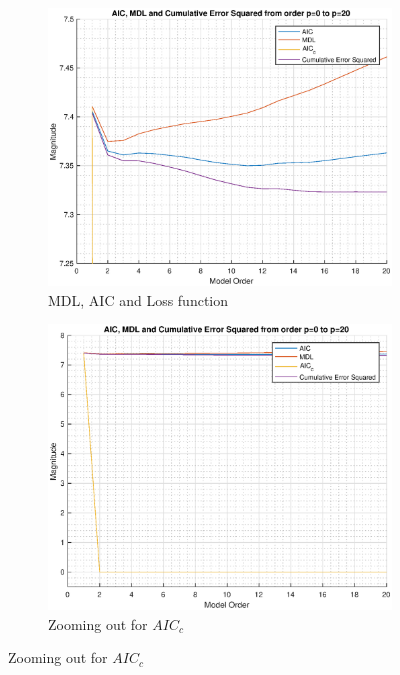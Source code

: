 \begin{figure}[h!]
\centering
\begin{subfigure}{0.32\textwidth}
\centering
\includegraphics[width = \textwidth]{heart_mdl_t1_zoom}
\caption{MDL, AIC and Loss function}
\label{fig:heart_mdl_t1_zoom}
\end{subfigure}
\begin{subfigure}{0.32\textwidth}
\centering
\includegraphics[width = \textwidth]{heart_mdl_t1}
\caption{Zooming out for $AIC_c$}
\label{fig:heart_mdl_t1}
\end{subfigure}

\end{figure}

